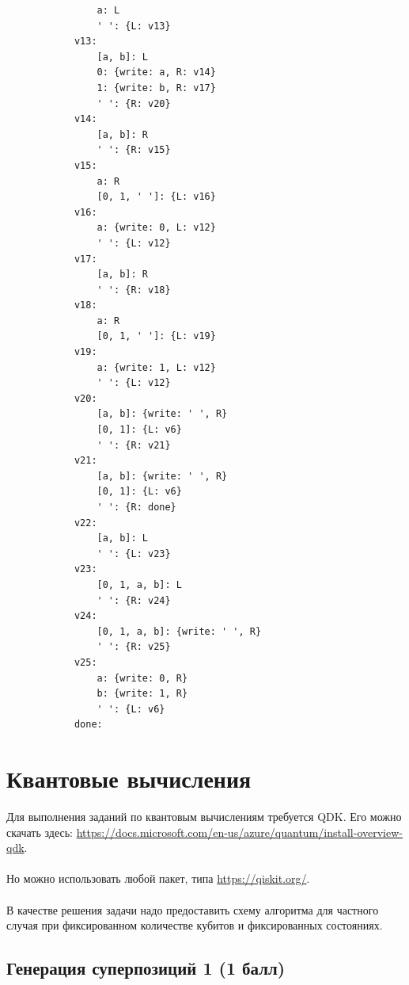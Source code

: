 \documentclass{article}
\begin{document}
\begin{enumerate}
\begin{enumerate}
\begin{lstlisting}
                a: L
                ' ': {L: v13}
            v13:
                [a, b]: L
                0: {write: a, R: v14}
                1: {write: b, R: v17}
                ' ': {R: v20}
            v14:
                [a, b]: R
                ' ': {R: v15}
            v15:
                a: R
                [0, 1, ' ']: {L: v16}
            v16:
                a: {write: 0, L: v12}
                ' ': {L: v12}
            v17:
                [a, b]: R
                ' ': {R: v18}
            v18:
                a: R
                [0, 1, ' ']: {L: v19}
            v19:
                a: {write: 1, L: v12}
                ' ': {L: v12}
            v20:
                [a, b]: {write: ' ', R}
                [0, 1]: {L: v6}
                ' ': {R: v21}
            v21:
                [a, b]: {write: ' ', R}
                [0, 1]: {L: v6}
                ' ': {R: done}
            v22:
                [a, b]: L
                ' ': {L: v23}
            v23:
                [0, 1, a, b]: L
                ' ': {R: v24}
            v24:
                [0, 1, a, b]: {write: ' ', R}
                ' ': {R: v25}
            v25:
                a: {write: 0, R}
                b: {write: 1, R}
                ' ': {L: v6}
            done:
        \end{lstlisting}
    \end{enumerate}
    
    
\end{enumerate}


\section{Квантовые вычисления}

Для выполнения заданий по квантовым вычислениям требуется QDK. Его можно скачать здесь: \url{https://docs.microsoft.com/en-us/azure/quantum/install-overview-qdk}. 
\\\\
Но можно использовать любой пакет, типа \url{https://qiskit.org/}. 
\\\\
В качестве решения задачи надо предоставить схему алгоритма для частного случая при фиксированном количестве кубитов и фиксированных состояниях. 


\subsection{Генерация суперпозиций 1 (1 балл)}
\end{document}
